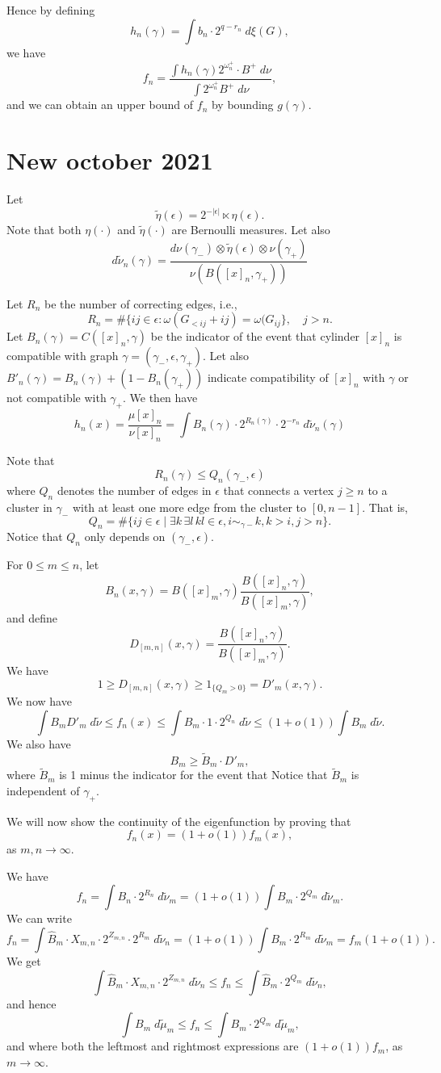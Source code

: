 \documentclass[11pt, a4paper, oneside]{scrartcl}
\theoremstyle{definition}
\theoremstyle{remark}
\providecommand{\ordo}[1]{{o(#1)}}
\providecommand{\e}{\epsilon}
\providecommand{\g}{\gamma}
\begin{document}
Hence by defining
$$h_n(\gamma)=\int b_n \cdot 2^{q-r_n}\; d\xi(G),$$
we have
$$f_n=\frac{\int h_n(\gamma)2^{\omega_n^+}\cdot B^+\; d\nu}{\int 2^{\omega_n^+} B^+\; d\nu},$$
and we can obtain an upper bound of $f_n$ by bounding $g(\gamma)$.

\section{New october 2021}


Let
$$
\tilde \eta(\epsilon)= 2^{-|\epsilon|} \ltimes \eta (\epsilon).
$$
Note that both $\eta(\cdot)$ and $\tilde\eta (\cdot)$ are Bernoulli measures.
Let also
$$
d\tilde \nu_n(\gamma) =
\frac{d\nu(\gamma_-)\otimes \tilde \eta(\epsilon)\otimes \nu(\gamma_+)}{\nu(B([x]_n,\gamma_+))}
$$

Let $R_n$ be the number of correcting edges, i.e.,
$$
R_n=\# \{ij\in \epsilon: \omega (G_{< ij}+ij)=\omega (G_{ij}\},\quad j>n.
$$
Let $B_n(\g)=C([x]_n,\gamma)$ be the indicator of the event that cylinder $[x]_n$ is compatible with graph $\g=(\g_-,\e,\g_+)$.
Let also $B'_n(\g) = B_n(\g) + (1-B_n(\g_+))$ indicate compatibility of $[x]_n$ with $\g$ or not compatible with $\g_+$.
We then have
\[
  h_n(x) = \frac{\mu [x]_n}{\nu [x]_n}=\int B_n(\g) \cdot 2^{R_n(\g)} \cdot 2^{-r_n}\; d\tilde \nu_n (\gamma)
\]

Note that
$$ R_n(\g) \le Q_n(\g_-,\e) $$
where $Q_n$ denotes the number of edges in $\e$ that connects a vertex $j\ge n$ to a
cluster in $\g_-$ with at least one more edge from the cluster to $[0,n-1]$. That is,
$$  Q_n=\# \{ij \in \epsilon \mid  \exists k\, \exists l\, kl\in\e,  i \sim_{\gamma-} k, k>i, j > n\}.$$
Notice that $Q_n$ only depends on $(\gamma_-,\epsilon)$.

For $0\leq m\leq n$, let
$$B_n(x,\gamma)=B([x]_m,\gamma)\frac{B([x]_n,\gamma)}{B([x]_m, \gamma)},$$
and define
$$D_{[m,n]}(x,\gamma)=\frac{B([x]_n,\gamma)}{B([x]_m, \gamma)}.$$ We have
$$1\geq D_{[m,n]}(x,\gamma)\geq 1_{\{Q_m>0\}}=D'_m(x,\gamma).$$
We now have
$$ \int B_m D'_m \; d\tilde \nu \leq f_n(x)\leq \int B_m \cdot 1 \cdot 2^{Q_n} \; d\tilde \nu \leq (1+\ordo{1})\int B_m \; d\tilde \nu .$$
We also have
$$B_m\geq \tilde B_m \cdot D'_m,$$
where $\tilde B_m$ is 1 minus the indicator for the event that
Notice that $\tilde B_m$ is independent of $\gamma_+$.

We will now show the continuity of the eigenfunction by proving that
$$f_n(x)=(1+\ordo{1})f_m(x),$$
as $m,n \to \infty$.

We have
$$f_n=\int B_n \cdot 2^{R_n} \; d\tilde \nu_m=(1+\ordo{1})\int B_m \cdot 2^{Q_m} \; d\tilde \nu_m.$$
We can write
$$f_n=\int \hat B_m \cdot X_{m,n} \cdot 2^{Z_{m,n}}\cdot 2^{R_m}\; d\tilde \nu_n=(1+\ordo{1})\int B_m \cdot 2^{R_m}\; d\tilde \nu_m=f_m(1+\ordo{1}).$$
We get
$$\int \hat B_m \cdot X_{m,n} \cdot 2^{Z_{m,n}} \; d\tilde \nu_n \leq f_n\leq \int \hat B_m \cdot 2^{Q_m} \; d\tilde \nu_n,$$
and hence
$$\int B_m \; d\tilde \mu_m \leq f_n \leq \int  B_m \cdot 2^{Q_m} \; d\tilde \mu_m,$$
and where both the leftmost and rightmost expressions are $(1+\ordo{1})f_m$, as $m\to \infty$.
\end{document}
